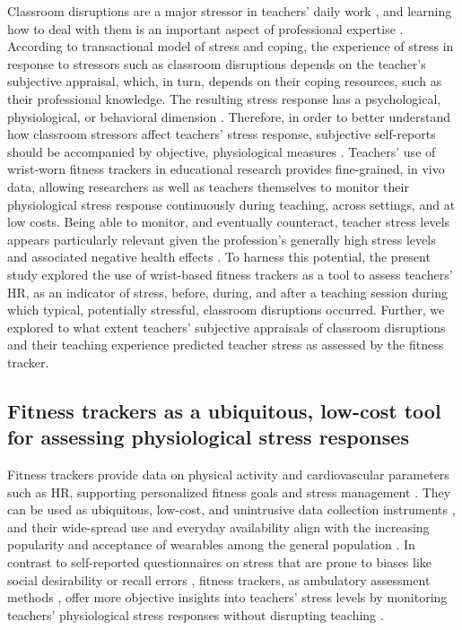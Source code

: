 \documentclass[preprint,
3p]{elsarticle} %
\begin{document}
Classroom disruptions are a major stressor in teachers' daily work
\citep{boyle1995structural, aloe2014multivariate}, and learning how to
deal with them is an important aspect of professional expertise
\citep{wolff2015keeping}. According to \citet{lazarus1990theory}
transactional model of stress and coping, the experience of stress in
response to stressors such as classroom disruptions depends on the
teacher's subjective appraisal, which, in turn, depends on their coping
resources, such as their professional knowledge. The resulting stress
response has a psychological, physiological, or behavioral dimension
\citep{kyriacou1978}. Therefore, in order to better understand how
classroom stressors affect teachers' stress response, subjective
self-reports should be accompanied by objective, physiological measures
\citep{wettstein2021}. Teachers' use of wrist-worn fitness trackers in
educational research provides fine-grained, in vivo data, allowing
researchers as well as teachers themselves to monitor their
physiological stress response continuously during teaching, across
settings, and at low costs. Being able to monitor, and eventually
counteract, teacher stress levels appears particularly relevant given
the profession's generally high stress levels and associated negative
health effects \citep{johnson2005experience, montgomery2005meta}. To
harness this potential, the present study explored the use of
wrist-based fitness trackers as a tool to assess teachers' HR, as an
indicator of stress, before, during, and after a teaching session during
which typical, potentially stressful, classroom disruptions occurred.
Further, we explored to what extent teachers' subjective appraisals of
classroom disruptions and their teaching experience predicted teacher
stress as assessed by the fitness tracker.

\subsection{Fitness trackers as a ubiquitous, low-cost tool for
assessing physiological stress
responses}\label{fitness-trackers-as-a-ubiquitous-low-cost-tool-for-assessing-physiological-stress-responses}

Fitness trackers provide data on physical activity and cardiovascular
parameters such as HR, supporting personalized fitness goals
\citep{nuss2021effects} and stress management \citep{hao2018chrv}. They
can be used as ubiquitous, low-cost, and unintrusive data collection
instruments \citep{godfrey2018z}, and their wide-spread use and everyday
availability align with the increasing popularity and acceptance of
wearables among the general population \citep{peng2022acceptance}. In
contrast to self-reported questionnaires on stress
\citep{chaplain2008, liu2020} that are prone to biases like social
desirability \citep{razavi2001self} or recall errors
\citep{van2016accuracy}, fitness trackers, as ambulatory assessment
methods \citep{trull2013ambulatory, wettstein2020ambulatory}, offer more
objective insights into teachers' stress levels by monitoring teachers'
physiological stress responses without disrupting teaching
\citep{donker2018, runge2020}.
\end{document}
